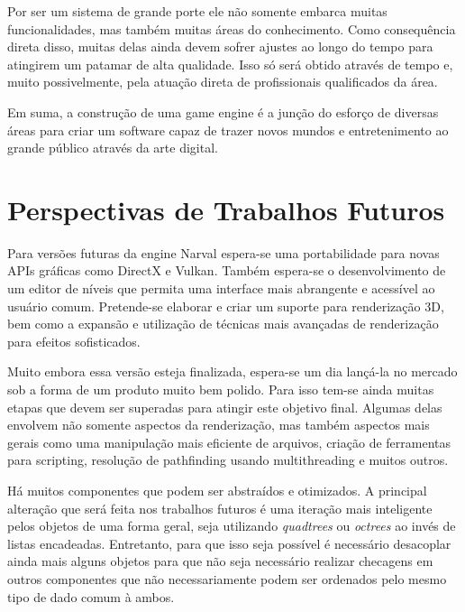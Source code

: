 \documentclass[12pt, 
openright, 
oneside, 
a4paper,    
brazil]{facom-ufu-abntex2}
\begin{document}
Por ser um sistema de grande porte ele não somente embarca muitas funcionalidades, mas também muitas áreas do conhecimento. Como consequência direta disso, muitas delas ainda devem sofrer ajustes ao longo do tempo para atingirem um patamar de alta qualidade. Isso só será obtido através de tempo e, muito possivelmente, pela atuação direta de profissionais qualificados da área.

Em suma, a construção de uma game engine é a junção do esforço de diversas áreas para criar um software capaz de trazer novos mundos e entretenimento ao grande público através da arte digital.

\section{Perspectivas de Trabalhos Futuros}

Para versões futuras da engine Narval espera-se uma portabilidade para novas APIs gráficas como DirectX e Vulkan. Também espera-se o desenvolvimento de um editor de níveis que permita uma interface mais abrangente e acessível ao usuário comum. Pretende-se elaborar e criar um suporte para renderização 3D, bem como a expansão e utilização de técnicas mais avançadas de renderização para efeitos sofisticados.

Muito embora essa versão esteja finalizada, espera-se um dia lançá-la no mercado sob a forma de um produto muito bem polido. Para isso tem-se ainda muitas etapas que devem ser superadas para atingir este objetivo final. Algumas delas envolvem não somente aspectos da renderização, mas também aspectos mais gerais como uma manipulação mais eficiente de arquivos, criação de ferramentas para scripting, resolução de pathfinding usando multithreading e muitos outros.

Há muitos componentes que podem ser abstraídos e otimizados. A principal alteração que será feita nos trabalhos futuros é uma iteração mais inteligente pelos objetos de uma forma geral, seja utilizando \textit{quadtrees} ou \textit{octrees} ao invés de listas encadeadas. Entretanto, para que isso seja possível é necessário desacoplar ainda mais alguns objetos para que não seja necessário realizar checagens em outros componentes que não necessariamente podem ser ordenados pelo mesmo tipo de dado comum à ambos.



\postextual
\end{document}
